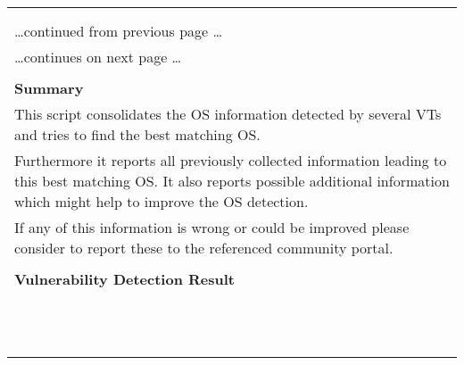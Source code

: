 \documentclass{article}
\begin{document}
\begin{longtable}{|p{}|}
\hline
\rowcolor{gvm_log}{\color{white}{Log (CVSS: 0.0) }}\\
\rowcolor{gvm_log}{\color{white}{NVT: OS Detection Consolidation and Reporting}}\\
\hline
\endfirsthead
\hfill\ldots continued from previous page \ldots \\
\hline
\endhead
\hline
\ldots continues on next page \ldots \\
\endfoot
\hline
\endlastfoot
\\
\textbf{Summary}\\
This script consolidates the OS information detected by several
  VTs and tries to find the best matching OS.\\
  Furthermore it reports all previously collected information leading to this best matching OS. It
  also reports possible additional information which might help to improve the OS detection.\\
  If any of this information is wrong or could be improved please consider to report these to the
  referenced community portal.\\

        \hline
        \\
\textbf{Vulnerability Detection Result}\\
\rowcolor{white}{\verb=Best matching OS:=}\\
\rowcolor{white}{\verb=OS:           AVM FRITZ!OS=}\\
\rowcolor{white}{\verb=CPE:          cpe:/o:avm:fritz%21_os=}\\
\rowcolor{white}{\verb=Found by NVT: 1.3.6.1.4.1.25623.1.0.103910 (AVM FRITZ!Box / FRITZ!OS Detection C=}\\
\rowcolor{white}{$\hookrightarrow$\verb=onsolidation)=}\\
\rowcolor{white}{\verb=Setting key "Host/runs_unixoide" based on this information=}\\
\rowcolor{white}{\verb=Other OS detections (in order of reliability):=}\\
\rowcolor{white}{\verb=OS:           AVM FRITZ!OS=}\\
\rowcolor{white}{\verb=CPE:          cpe:/o:avm:fritz%21_os=}\\
\rowcolor{white}{\verb=Found by NVT: 1.3.6.1.4.1.25623.1.0.108201 (Operating System (OS) Detection (SIP=}\\
\rowcolor{white}{$\hookrightarrow$\verb=))=}\\
\rowcolor{white}{\verb=Concluded from SIP server banner on port 5060/tcp: User-Agent Banner: FRITZ!OS=}\\


\end{longtable}
\end{document}
